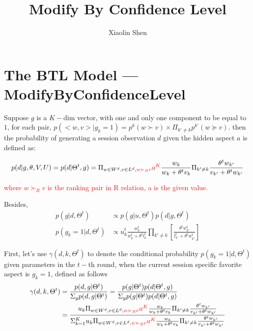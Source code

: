 \documentclass{article}
\title{Modify By Confidence Level}
\author{Xiaolin Shen}
\begin{document}
 

\maketitle


\section{The BTL Model ---ModifyByConfidenceLevel}
 
 Suppose $g$ is a $K-$dim vector, with one and only one component to be equal to $1$, for each pair, $p(<w,v>|g_k=1) = p^k(w\succ v) \times \Pi_{k'\neq k} p^{k'}(w \succeq v)$. then the probability of generating a session observation $d$ given the hidden aspect $a$ is defined as:

\begin{align}\label{equ:skyline}
		p(d|g,\theta,V,U) %
        =p(d|\Theta^t,g)=\Pi_{w \in W^d, v\in L^d,\textcolor{red}{ w \succ_R v}} \textcolor{red}{a^K} \frac{w_k}{w_k+\theta^t v_k}\Pi_{k'\neq k}\frac{\theta^t w_{k'}}{v_{k'}+\theta^t w_{k'}}
\end{align}

\textcolor{red}{where $ w \succ_R v $ is the ranking pair in R relation, a is the given value.}

Besides,
\begin{eqnarray}
p(g|d,\Theta^{t}) & \propto   p(g|u,\Theta^{t}) p(d|g,\Theta^{t}) \\ \nonumber
 p(g_k=1|d,\Theta^{t}) & \propto  u_k^{t} \frac{w_{k}^t} {w_{k}^t+\theta^t l_{k}^t} \prod_{k'\neq k}  [\frac{\theta^t w_{k'}^t} {l_{k'}^t + \theta^t w_{k'}^t}]
\end{eqnarray}

First, let's use $\gamma(d,k,\Theta^t)$ to denote the conditional probability $p(g_k=1|d,\Theta^t)$ given parameters in the $t-$th round, when the current session specific favorite aspect is $g_k=1$, defined as follows
\begin{align}\label{equ:conditional}
\gamma(d,k,\Theta^t) &=\frac{p(d,g|\Theta^t)}{\Sigma_g p(d,g|\Theta^t)} = \frac{p(g|\Theta^t)p(d|\Theta^t,g)}{\Sigma_g p(g|\Theta^t)p(d|\Theta^t,g)}\\\nonumber
&=\frac{u_k \Pi_{w \in W^d, v\in L^d,\textcolor{red}{ w \succ_R v}} \textcolor{red}{a^K}\frac{w_k}{w_k+\theta^t v_k}\Pi_{k'\neq k}\frac{\theta^t w_{k'}}{v_{k'}+\theta^t w_{k'}}}{\Sigma_{k=1}^K u_k \Pi_{w \in W^d, v\in L^d,\textcolor{red}{ w \succ_R v}} \textcolor{red}{a^K} \frac{w_k}{w_k+\theta^t v_k}\Pi_{k'\neq k}\frac{\theta^t w_{k'}}{v_{k'}+\theta^t w_{k'}}}
\end{align}
\end{document}
